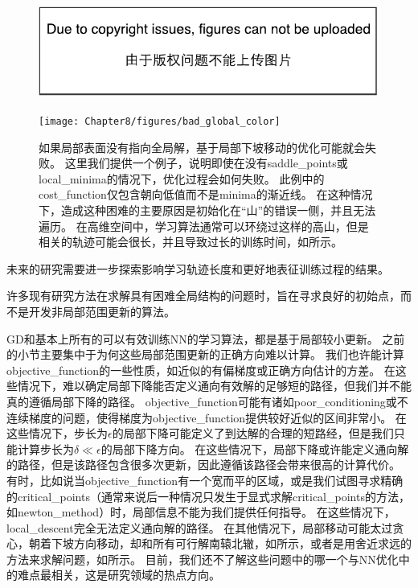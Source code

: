 \begin{figure}[!htb]
\ifOpenSource
\centerline{\includegraphics{figure.pdf}}
\else
\centerline{\texttt{[image: Chapter8/figures/bad\_global\_color]}}
\fi
\caption{如果局部表面没有指向全局解，基于局部下坡移动的优化可能就会失败。
这里我们提供一个例子，说明即使在没有\gls{saddle_points}或\gls{local_minima}的情况下，优化过程会如何失败。
此例中的\gls{cost_function}仅包含朝向低值而不是\gls{minima}的渐近线。
在这种情况下，造成这种困难的主要原因是初始化在``山''的错误一侧，并且无法遍历。
在高维空间中，学习算法通常可以环绕过这样的高山，但是相关的轨迹可能会很长，并且导致过长的训练时间，如所示。
}
\label{fig:chap8_bad_global}
\end{figure}


未来的研究需要进一步探索影响学习轨迹长度和更好地表征训练过程的结果。


许多现有研究方法在求解具有困难全局结构的问题时，旨在寻求良好的初始点，而不是开发非局部范围更新的算法。


\gls{GD}和基本上所有的可以有效训练\gls{NN}的学习算法，都是基于局部较小更新。
之前的小节主要集中于为何这些局部范围更新的正确方向难以计算。
我们也许能计算\gls{objective_function}的一些性质，如近似的有偏梯度或正确方向估计的方差。
在这些情况下，难以确定局部下降能否定义通向有效解的足够短的路径，但我们并不能真的遵循局部下降的路径。
\gls{objective_function}可能有诸如\gls{poor_conditioning}或不连续梯度的问题，使得梯度为\gls{objective_function}提供较好近似的区间非常小。
在这些情况下，步长为$\epsilon$的局部下降可能定义了到达解的合理的短路经，但是我们只能计算步长为$\delta \ll \epsilon$的局部下降方向。
在这些情况下，局部下降或许能定义通向解的路径，但是该路径包含很多次更新，因此遵循该路径会带来很高的计算代价。
有时，比如说当\gls{objective_function}有一个宽而平的区域，或是我们试图寻求精确的\gls{critical_points}（通常来说后一种情况只发生于显式求解\gls{critical_points}的方法，如\gls{newton_method}）时，局部信息不能为我们提供任何指导。
在这些情况下，\gls{local_descent}完全无法定义通向解的路径。
在其他情况下，局部移动可能太过贪心，朝着下坡方向移动，却和所有可行解南辕北辙，如所示，或者是用舍近求远的方法来求解问题，如所示。
目前，我们还不了解这些问题中的哪一个与\gls{NN}优化中的难点最相关，这是研究领域的热点方向。

